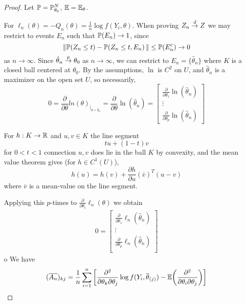 \begin{proof}
  Let $\Prob = \Prob_{\theta_{0}}^{N}$, $\E = \mathbb{E}_{\theta}$.

  For $\ell_{n}(\theta) = -Q_{n}(\theta) = \frac{1}{n} \log f(Y_{i},
  \theta)$.  When proving $Z_{n} \overset{d}{\rightarrow} Z$ we may restrict to events
  $E_{n}$ such that $\Prob{E_{n}} \rightarrow 1$, since
  \begin{equation}
    \label{eq:61}
    \| \Prob{Z_{n} \leq t}- \Prob{Z_{n} \leq t, E_{n}} \| \leq
    \Prob{E_{n}^{c}} \rightarrow 0
  \end{equation} as $n \rightarrow \infty$.  Since $\hat \theta_{n}
  \overset{p}{\rightarrow} \theta_{0}$ as $n \rightarrow \infty$, we can restrict to $E_{n}
  = \{ \hat \theta_{n} \}$ where $K$ is a closed ball centered at
  $\theta_{0}$.  By the assumptions, $\ln$ is $C^{2}$ on $U$, and
  $\hat \theta_{n}$ is a maximizer on the open set $U$, so necessarily,
  \begin{equation}
    \label{eq:62}
    0 = \frac{\partial}{\partial \theta} ln(\theta)_{|_{\theta = \hat \theta_{n}}} =
    \frac{\partial}{\partial \theta} \ln (\hat \theta_{n}) =
    \begin{bmatrix}
      \frac{\partial}{\partial \theta_{1}} \ln (\hat \theta_{n}) \\
      \vdots \\
      \frac{\partial}{\partial \theta_{p}} \ln (\hat \theta_{n})
    \end{bmatrix}
  \end{equation}

  For $h: K \rightarrow \mathbb{R}$ and $u, v \in K$ the line segment
  \begin{equation}
    \label{eq:63}
    tu + (1-t)v
  \end{equation} for $0 < t < 1$ connection $u, v$ does lie in the
  ball $K$ by convexity, and the mean value theorem gives (for $h \in
  C^{1}(U)$),
  \begin{equation}
    \label{eq:64}
    h(u) = h(v) + \frac{\partial h}{\partial u} (\overline v)^{T} (u-v)
  \end{equation} where $\overline v$ is a mean-value on the line
  segment.

  Applying this $p$-times to $\frac{\partial}{\partial \theta_{i}}
  \ell_{n}(\theta)$ we obtain
  \begin{align}
    \label{eq:65}
    0 =
    \begin{bmatrix}
      \frac{\partial}{\partial \theta_{1}} \ell_{n}(\hat \theta_{n})  \\
      \vdots \\
      \frac{\partial}{\partial \theta_{p}} \ell_{n}(\hat \theta_{n})  \\
    \end{bmatrix}
  \end{align} 
o
  We have
  \begin{align}
    \label{eq:66}
    (\overline{A_{n}})_{kj} = \frac{1}{n} \sum_{i=1}^{n} \left[
    \frac{\partial^{2}}{\partial \theta_{k} \partial \theta_{j}} \log
    f(Y_{i}, \overline{\theta}_{(j)}) -
    \E{\frac{\partial^{2}}{\partial \theta_{i} \partial \theta_{j}}} \right]
  \end{align}
\end{proof}

